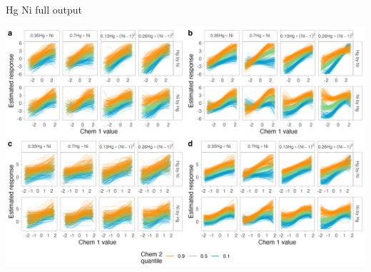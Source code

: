 \documentclass[12pt, twoside]{amherstthesis}
\begin{document}
Hg Ni full output
\begin{center}\includegraphics[width=1\linewidth]{figures/ch4_hgni_biv} \end{center}
\end{document}
